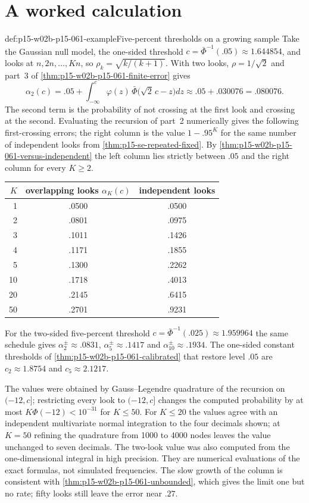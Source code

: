 \section{A worked calculation}
\label{sec:p15-w02b-p15-061-worked}

\begin{hbexample}{def:p15-w02b-p15-061-example}{Five-percent thresholds on a growing sample}
Take the Gaussian null model, the one-sided threshold
\(c=\bar\Phi^{-1}(.05)\approx1.644854\), and looks at
\(n,2n,\ldots,Kn\), so \(\rho_k=\sqrt{k/(k+1)}\).
With two looks, \(\rho=1/\sqrt2\) and part~3 of
\cref{thm:p15-w02b-p15-061-finite-error} gives
\[
 \alpha_2(c)=.05+\int_{-\infty}^{c}\varphi(z)\,
 \bar\Phi\bigl(\sqrt2\,c-z\bigr)dz\approx.05+.030076=.080076 .
\]
The second term is the probability of not crossing at the first look and
crossing at the second. Evaluating the recursion of part~2 numerically
gives the following first-crossing errors; the right column is the value
\(1-.95^K\) for the same number of independent looks from
\cref{thm:p15-se-repeated-fixed}. By
\cref{thm:p15-w02b-p15-061-versus-independent} the left column lies
strictly between \(.05\) and the right column for every \(K\geq2\).
\begin{center}
\begin{tabular}{rcc}
\(K\) & overlapping looks \(\alpha_K(c)\) & independent looks\\
\hline
1 & .0500 & .0500\\
2 & .0801 & .0975\\
3 & .1011 & .1426\\
4 & .1171 & .1855\\
5 & .1300 & .2262\\
10 & .1718 & .4013\\
20 & .2145 & .6415\\
50 & .2701 & .9231
\end{tabular}
\end{center}
For the two-sided five-percent threshold \(c=\bar\Phi^{-1}(.025)\approx
1.959964\) the same schedule gives
\(\alpha^{\pm}_2\approx.0831\), \(\alpha^{\pm}_5\approx.1417\) and
\(\alpha^{\pm}_{10}\approx.1934\). The one-sided constant thresholds of
\cref{thm:p15-w02b-p15-061-calibrated} that restore level \(.05\) are
\(c_2\approx1.8754\) and \(c_5\approx2.1217\).

The values were obtained by Gauss--Legendre quadrature of the recursion
on \((-12,c]\); restricting every look to \((-12,c]\) changes the
computed probability by at most \(K\Phi(-12)<10^{-31}\) for
\(K\leq50\). For \(K\leq20\) the values agree with an independent
multivariate normal integration to the four decimals shown; at
\(K=50\) refining the quadrature from 1000 to 4000 nodes leaves the
value unchanged to seven decimals. The two-look value was also
computed from the one-dimensional integral in high precision. They are
numerical evaluations of the exact formulas, not simulated frequencies.
The slow growth of the column is consistent with
\cref{thm:p15-w02b-p15-061-unbounded}, which gives the limit one but no
rate; fifty looks still leave the error near \(.27\).
\end{hbexample}

